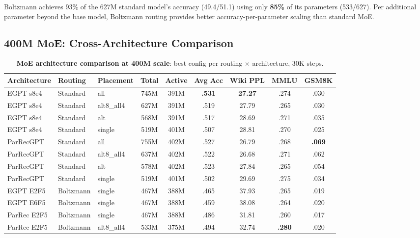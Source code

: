 \documentclass[oneside]{article}
\begin{document}
Boltzmann achieves 93\% of the 627M standard model's accuracy (49.4/51.1) using only \textbf{85\%} of its parameters (533/627). Per additional parameter beyond the base model, Boltzmann routing provides better accuracy-per-parameter scaling than standard MoE.


\subsection{400M MoE: Cross-Architecture Comparison}
\label{sec:moe_arch}

\begin{table}[t]
\centering
\caption{\textbf{MoE architecture comparison at 400M scale}: best config per routing $\times$ architecture, 30K steps.}
\label{tab:moe_arch_compare}
\begin{adjustbox}{max width=\textwidth}
\begin{tabular}{l|l|l|cc|c|c|cc}
\toprule
\textbf{Architecture} & \textbf{Routing} & \textbf{Placement} & \textbf{Total} & \textbf{Active} & \textbf{Avg Acc} & \textbf{Wiki PPL} & \textbf{MMLU} & \textbf{GSM8K} \\
\midrule
EGPT s8e4       & Standard  & all       & 745M & 391M & \textbf{.531} & \textbf{27.27} & .274 & .030 \\
EGPT s8e4       & Standard  & alt8\_all4 & 627M & 391M & .519 & 27.79 & .265 & .030 \\
EGPT s8e4       & Standard  & alt       & 568M & 391M & .517 & 28.69 & .271 & .035 \\
EGPT s8e4       & Standard  & single    & 519M & 401M & .507 & 28.81 & .270 & .025 \\
\midrule
ParRecGPT       & Standard  & all       & 755M & 402M & .527 & 26.79 & .268 & \textbf{.069} \\
ParRecGPT       & Standard  & alt8\_all4 & 637M & 402M & .522 & 26.68 & .271 & .062 \\
ParRecGPT       & Standard  & alt       & 578M & 402M & .523 & 27.84 & .265 & .054 \\
ParRecGPT       & Standard  & single    & 519M & 401M & .502 & 29.69 & .275 & .034 \\
\midrule
EGPT E2F5       & Boltzmann & single    & 467M & 388M & .465 & 37.93 & .265 & .019 \\
EGPT E6F5       & Boltzmann & single    & 467M & 388M & .459 & 38.08 & .264 & .020 \\
ParRec E2F5     & Boltzmann & single    & 467M & 388M & .486 & 31.81 & .260 & .017 \\
ParRec E2F5     & Boltzmann & alt8\_all4 & 533M & 375M & .494 & 32.74 & \textbf{.280} & .020 \\
\bottomrule
\end{tabular}
\end{adjustbox}
\end{table}
\end{document}
